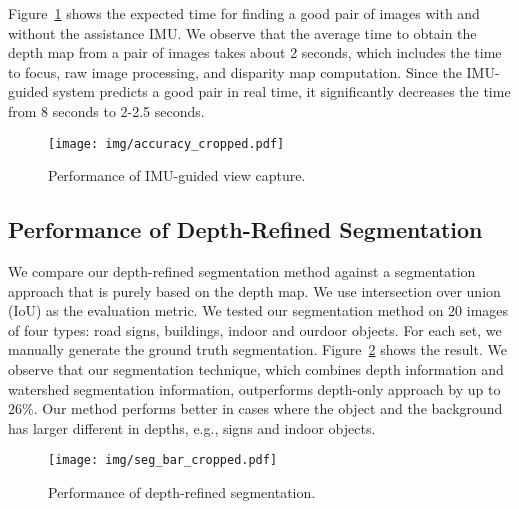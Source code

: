 
Figure~\ref{fig:accuracy_bar} shows the expected time for finding a good pair of images with and without the assistance IMU. We observe that the average time to obtain the depth map from a pair of images takes about 2 seconds, which includes the time to focus, raw image processing, and disparity map computation. Since the IMU-guided system predicts a good pair in real time, it significantly decreases the time from 8 seconds to 2-2.5 seconds.

\begin{figure}[!htb]
	\begin{center}
		\texttt{[image: img/accuracy\_cropped.pdf]}
		\caption{Performance of IMU-guided view capture.}
		\label{fig:accuracy_bar}
	\end{center}
\end{figure}


\subsection{Performance of Depth-Refined Segmentation}

We compare our depth-refined segmentation method against a segmentation approach that is purely based on the depth map. We use intersection over union (IoU) as the evaluation metric. We tested our segmentation method on 20 images of four types: road signs, buildings, indoor and ourdoor objects. For each set, we manually generate the ground truth segmentation. Figure~\ref{fig:seg_bar} shows the result. We observe that our segmentation technique, which combines depth information and watershed segmentation information, outperforms depth-only approach by up to $26\%$. Our method performs better in cases where the object and the background has larger different in depths, e.g., signs and indoor objects.

\begin{figure}[!htb]
	\begin{center}
		\texttt{[image: img/seg\_bar\_cropped.pdf]}
		\caption{Performance of depth-refined segmentation.}
		\label{fig:seg_bar}
	\end{center}
\end{figure}


